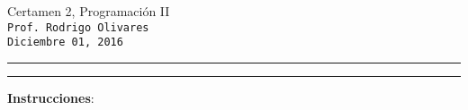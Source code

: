 \documentclass[10pt]{article}
\begin{document}
    \begin{center}
		{\Large Certamen 2, Programaci\'on II} \\
		\texttt{\small Prof. Rodrigo Olivares} \\
		\texttt{\scriptsize Diciembre 01, 2016} 
	\end{center}

	\vspace*{-35pt}
	\begin{center}
		\rule{1\textwidth}{.3pt}
	\end{center}
	\vspace*{-42pt}
	\begin{center}
		\rule{1\textwidth}{2pt}
	\end{center}

	\vspace*{-15pt}

	{\small \textbf{Instrucciones}:}

	\vspace*{-15pt}
\end{document}
